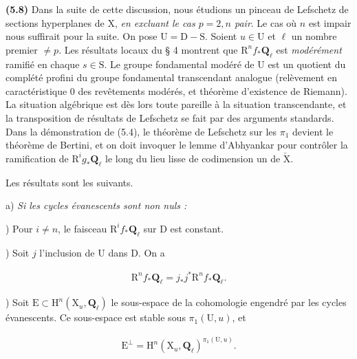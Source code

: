 \documentclass[10pt,leqno]{article}
\begin{document}
\noindent \textbf{(5.8)} Dans la suite de cette discussion, nous étudions un pinceau de Lefschetz de sections hyperplanes de \(\mathrm{X}\), \emph{en excluant le cas \(p=2, n\) pair}. Le cas où \(n\) est impair nous suffirait pour la suite. On pose \(\mathrm{U}=\mathrm{D}- \mathrm{S}\). Soient \(u\in \mathrm{U}\) et \(\ell \) un nombre premier \(\ne p\). Les résultats locaux du § 4 montrent que \(\mathrm{R}^{n} f_{*}\mathbf{Q}_{\ell }\) est \emph{modérément} ramifié en chaque \(s\in \mathrm{S}\). Le groupe fondamental modéré de \(\mathrm{U}\) est un quotient du complété profini du groupe fondamental transcendant analogue (relèvement en caractéristique 0 des revêtements modérés, et théorème d’existence de Riemann). La situation algébrique est dès lors toute pareille à la situation transcendante, et la transposition de résultats de Lefschetz se fait par des arguments standards. Dans la démonstration de (5.4), le théorème de Lefschetz sur les \(\pi _{1}\) devient le théorème de Bertini, et on doit invoquer le lemme d’Abhyankar pour contrôler la ramification de \(\mathrm{R}^{i} g_{*}\mathbf{Q}_{\ell }\) le long du lieu lisse de codimension un de \(\check{\mathrm{X}}\).\par

\noindent Les résultats sont les suivants.\par

\noindent a) \emph{Si les cycles évanescents sont non nuls :}\par

) Pour \(i\ne n\), le faisceau \(\mathrm{R}^{i} f_{*}\mathbf{Q}_{\ell }\) sur \(\mathrm{D}\) est constant.\par

) Soit \(j\) l’inclusion de \(\mathrm{U}\) dans \(\mathrm{D}\). On a\par

\begin{equation*}\begin{gathered}\mathrm{R}^{n} f_{*}\mathbf{Q}_{\ell } = j_{*}j^{*}\mathrm{R}^{n} f_{*}\mathbf{Q}_{\ell }.\end{gathered}\end{equation*}

) Soit \(\mathrm{E}\subset \mathrm{H}^{n}(\mathrm{X}_{u},\mathbf{Q}_{\ell })\) le sous-espace de la cohomologie engendré par les cycles évanescents. Ce sous-espace est stable sous \(\pi _{1}(\mathrm{U},u)\), et\par

\begin{equation*}\begin{gathered}\mathrm{E}^{\perp } = \mathrm{H}^{n}(\mathrm{X}_{u},\mathbf{Q}_{\ell })^{\pi _{1}(\mathrm{U},u)}.\end{gathered}\end{equation*}
\end{document}
